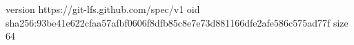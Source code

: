 version https://git-lfs.github.com/spec/v1
oid sha256:93be41e622cfaa57afbf0606f8dfb85c8e7e73d881166dfe2afe586c575ad77f
size 64
